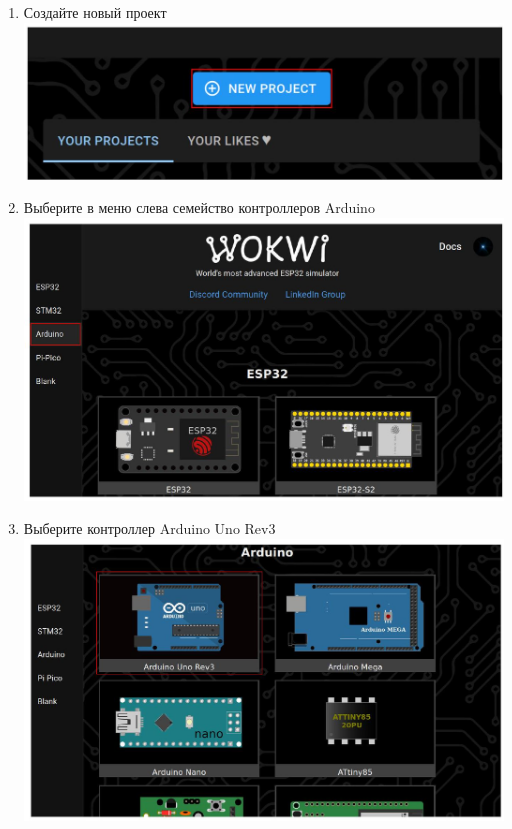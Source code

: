 \begin{enumerate}
    \item Создайте новый проект\\
    \includegraphics[max width=\maxwidth, max height=\maxheight, center]{4}
    
    \clearpage\item Выберите в меню слева семейство контроллеров Arduino\\
    \includegraphics[max width=\maxwidth, max height=\maxheight, center]{5}
    
    \item Выберите контроллер Arduino Uno Rev3\\
    \includegraphics[max width=\maxwidth, max height=\maxheight, center]{6}


\end{enumerate}
